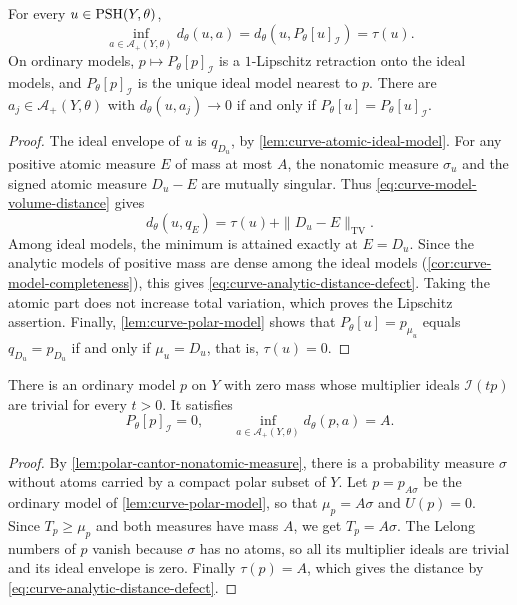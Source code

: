 \begin{proposition}\label{prop:curve-analytic-distance-defect}
For every $u\in\mathrm{PSH}(Y,\theta)$,
\begin{equation}\label{eq:curve-analytic-distance-defect}
 \inf_{a\in\mathcal A_+(Y,\theta)}d_\theta(u,a)
 =d_\theta(u,P_\theta[u]_{\mathcal I})=\tau(u).
\end{equation}
On ordinary models, $p\mapsto P_\theta[p]_{\mathcal I}$ is a $1$-Lipschitz retraction onto the ideal models, and $P_\theta[p]_{\mathcal I}$ is the unique ideal model nearest to $p$. There are $a_j\in\mathcal A_+(Y,\theta)$ with $d_\theta(u,a_j)\to0$ if and only if $P_\theta[u]=P_\theta[u]_{\mathcal I}$.
\end{proposition}
\begin{proof}
The ideal envelope of $u$ is $q_{D_u}$, by \cref{lem:curve-atomic-ideal-model}. For any positive atomic measure $E$ of mass at most $A$, the nonatomic measure $\sigma_u$ and the signed atomic measure $D_u-E$ are mutually singular. Thus \eqref{eq:curve-model-volume-distance} gives
\begin{equation}\label{eq:curve-finite-analytic-comparison}
 d_\theta(u,q_E)=\tau(u)+\|D_u-E\|_{\mathrm{TV}}.
\end{equation}
Among ideal models, the minimum is attained exactly at $E=D_u$. Since the analytic models of positive mass are dense among the ideal models (\cref{cor:curve-model-completeness}), this gives \eqref{eq:curve-analytic-distance-defect}. Taking the atomic part does not increase total variation, which proves the Lipschitz assertion. Finally, \cref{lem:curve-polar-model} shows that $P_\theta[u]=p_{\mu_u}$ equals $q_{D_u}=p_{D_u}$ if and only if $\mu_u=D_u$, that is, $\tau(u)=0$.
\end{proof}

\begin{example}\label{ex:diffuse-polar-zero-model}
There is an ordinary model $p$ on $Y$ with zero mass whose multiplier ideals $\mathcal I(tp)$ are trivial for every $t>0$. It satisfies
\[
 P_\theta[p]_{\mathcal I}=0,\qquad
 \inf_{a\in\mathcal A_+(Y,\theta)}d_\theta(p,a)=A.
\]
\end{example}
\begin{proof}
By \cref{lem:polar-cantor-nonatomic-measure}, there is a probability measure $\sigma$ without atoms carried by a compact polar subset of $Y$. Let $p=p_{A\sigma}$ be the ordinary model of \cref{lem:curve-polar-model}, so that $\mu_p=A\sigma$ and $U(p)=0$. Since $T_p\geq\mu_p$ and both measures have mass $A$, we get $T_p=A\sigma$. The Lelong numbers of $p$ vanish because $\sigma$ has no atoms, so all its multiplier ideals are trivial and its ideal envelope is zero. Finally $\tau(p)=A$, which gives the distance by \eqref{eq:curve-analytic-distance-defect}.
\end{proof}

